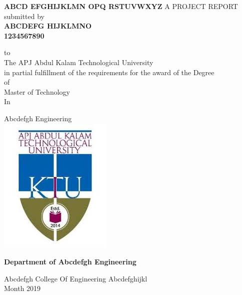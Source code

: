 \documentclass[12pt,a4paper]{report}
\def \reptitle{Abcd Efghijklmn Opq Rstuvwxyz}
\def \repauthor{ABCDEFG HIJKLMNO}
\def \repregno{1234567890}
\def \repdegree{Master of Technology}
\def \repbranch{Abcdefgh Engineering}
\def \repcollege{Abcdefgh College Of Engineering}
\def \repplace{Abcdefghijkl}
\def \repuniversity{APJ Abdul Kalam Technological University}
\def \repdate{Month 2019}
\begin{document}
\makeatletter
\renewcommand\chapter{\if@openright\cleardoublepage\else\clearpage\fi
                    \thispagestyle{empty}%
                    \global\@topnum\z@
                    \@afterindentfalse
                    \secdef\@chapter\@schapter}
\makeatother

\begin{titlepage}

\begin{center}
    \textbf{\MakeUppercase{ \Large \reptitle}}
    \vspace{.5 cm}
    \break
    A PROJECT REPORT \\submitted by\\
    \vspace{0.3 cm}
    \textbf{ \large \repauthor \\
    \repregno }
    \vspace{0.3 cm}

	to \\ The \repuniversity \\ in partial fulfillment of the requirements 		for the award of the Degree \\ of \\ \repdegree \\ In

	\repbranch \\
	
	\vspace{0.4 cm}
    \includegraphics[height=0.4\textwidth]{ktu_logo}\par
	\vspace{0.5 cm}
	\textbf{\Large Department of \repbranch}

	\repcollege
	\break
	\repplace \\
	\repdate 
    
    \vfill
\end{center}

\end{titlepage}
\end{document}
